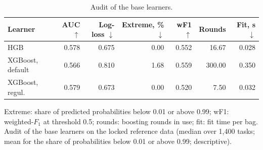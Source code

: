 \begin{table}[!htb]
\centering
\scriptsize
\setlength{\tabcolsep}{2.2pt}
\caption{Audit of the base learners.}
\label{tab:audit}
\begin{tabular}{@{}lrrrrrr@{}}
\toprule
Learner & AUC $\uparrow$ & Log-loss $\downarrow$ & Extreme, \% $\downarrow$ & wF1 $\uparrow$ & Rounds & Fit, s $\downarrow$ \\
\midrule
HGB & 0.578 & 0.675 & 0.00 & 0.552 & 16.67 & 0.028 \\
XGBoost, default & 0.566 & 0.810 & 1.68 & 0.559 & 300.00 & 0.350 \\
XGBoost, regul. & 0.579 & 0.673 & 0.00 & 0.520 & 7.50 & 0.032 \\
\bottomrule
\end{tabular}

\vspace{2pt}
\parbox{\linewidth}{\justifying\scriptsize *Extreme: share of predicted probabilities below 0.01 or above 0.99; wF1: weighted-$F_1$ at threshold 0.5; rounds: boosting rounds in use; fit: fit time per bag. Audit of the base learners on the locked reference data (median over 1,400 tasks; mean for the share of probabilities below 0.01 or above 0.99; descriptive).}
\end{table}
